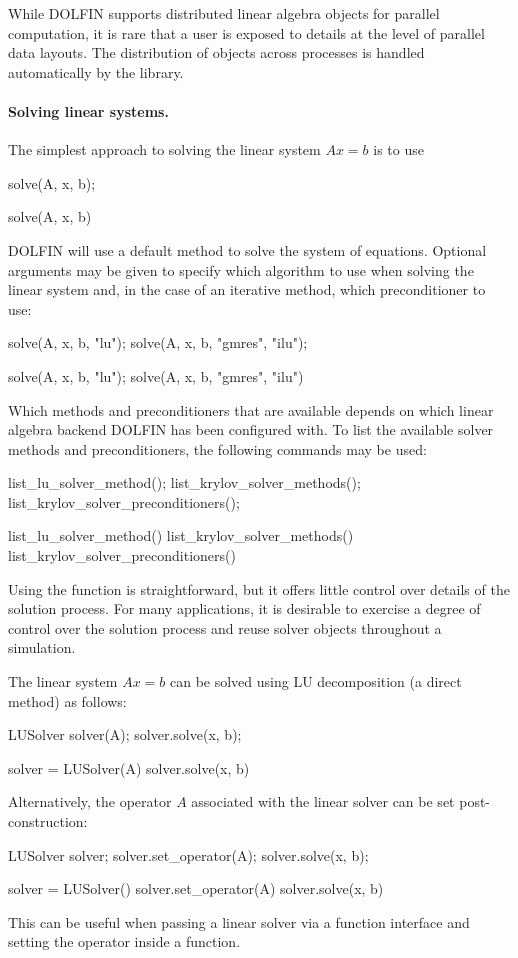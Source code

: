 While DOLFIN supports distributed linear algebra objects for parallel
computation, it is rare that a user is exposed to details at the level
of parallel data layouts. The distribution of objects across processes
is handled automatically by the library.

\paragraph{Solving linear systems.}

The simplest approach to solving the linear system $Ax = b$ is to use
%
\begin{c++}
solve(A, x, b);
\end{c++}
%
\begin{python}
solve(A, x, b)
\end{python}
%
DOLFIN will use a default method to solve the system of equations.
Optional arguments may be given to specify which algorithm to use when
solving the linear system and, in the case of an iterative method,
which preconditioner to use:
%
\begin{c++}
solve(A, x, b, "lu");
solve(A, x, b, "gmres", "ilu");
\end{c++}
%
\begin{python}
solve(A, x, b, "lu");
solve(A, x, b, "gmres", "ilu")
\end{python}
%
Which methods and preconditioners that are available depends on which
linear algebra backend DOLFIN has been configured with. To list the
available solver methods and preconditioners, the following commands
may be used:
%
\begin{c++}
list_lu_solver_method();
list_krylov_solver_methods();
list_krylov_solver_preconditioners();
\end{c++}
%
\begin{python}
list_lu_solver_method()
list_krylov_solver_methods()
list_krylov_solver_preconditioners()
\end{python}

Using the function  is straightforward, but it offers
little control over details of the solution process. For many
applications, it is desirable to exercise a degree of control over the
solution process and reuse solver objects throughout a simulation.

The linear system $Ax = b$ can be solved using LU decomposition
(a direct method) as follows:
%
\begin{c++}
LUSolver solver(A);
solver.solve(x, b);
\end{c++}
%
\begin{python}
solver = LUSolver(A)
solver.solve(x, b)
\end{python}
%
Alternatively, the operator $A$ associated with the linear solver
can be set post-construction:
%
\begin{c++}
LUSolver solver;
solver.set_operator(A);
solver.solve(x, b);
\end{c++}
%
\begin{python}
solver = LUSolver()
solver.set_operator(A)
solver.solve(x, b)
\end{python}
%
This can be useful when passing a linear solver via a function
interface and setting the operator inside a function.

